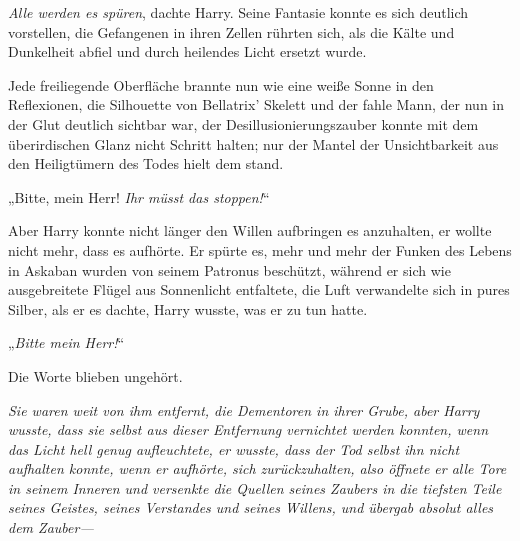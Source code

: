 \emph{Alle werden es spüren}, dachte Harry. Seine Fantasie konnte es sich deutlich vorstellen, die Gefangenen in ihren Zellen rührten sich, als die Kälte und Dunkelheit abfiel und durch heilendes Licht ersetzt wurde.

Jede freiliegende Oberfläche brannte nun wie eine weiße Sonne in den Reflexionen, die Silhouette von Bellatrix' Skelett und der fahle Mann, der nun in der Glut deutlich sichtbar war, der Desillusionierungszauber konnte mit dem überirdischen Glanz nicht Schritt halten; nur der Mantel der Unsichtbarkeit aus den Heiligtümern des Todes hielt dem stand.

„Bitte, mein Herr! \emph{Ihr müsst das stoppen!}“

Aber Harry konnte nicht länger den Willen aufbringen es anzuhalten, er wollte nicht mehr, dass es aufhörte. Er spürte es, mehr und mehr der Funken des Lebens in Askaban wurden von seinem Patronus beschützt, während er sich wie ausgebreitete Flügel aus Sonnenlicht entfaltete, die Luft verwandelte sich in pures Silber, als er es dachte, Harry wusste, was er zu tun hatte.

„\emph{Bitte mein Herr!}“

Die Worte blieben ungehört.

\emph{Sie waren weit von ihm entfernt, die Dementoren in ihrer Grube, aber Harry wusste, dass sie selbst aus dieser Entfernung vernichtet werden konnten, wenn das Licht hell genug aufleuchtete, er wusste, dass der Tod selbst ihn nicht aufhalten konnte, wenn er aufhörte, sich zurückzuhalten, also öffnete er alle Tore in seinem Inneren und versenkte die Quellen seines Zaubers in die tiefsten Teile seines Geistes, seines Verstandes und seines Willens, und übergab absolut alles dem Zauber—}

